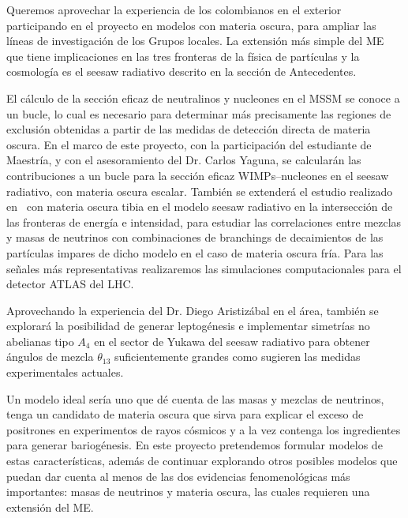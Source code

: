 \begin{darkmatter}
  Queremos aprovechar la experiencia de los colombianos en el exterior
  participando en el proyecto en modelos con materia oscura, para
  ampliar las líneas de investigación de los Grupos locales. La
  extensión más simple del ME que tiene implicaciones en las tres
  fronteras de la física de partículas y la cosmología es el seesaw
  radiativo descrito en la sección de Antecedentes.

  El cálculo de la sección eficaz de neutralinos y nucleones en el
  MSSM se conoce a un bucle, lo cual es necesario para determinar más
  precisamente las regiones de exclusión obtenidas a partir de las
  medidas de detección directa de materia oscura. En el marco de este
  proyecto, con la participación del estudiante de Maestría, y con el
  asesoramiento del Dr. Carlos Yaguna, se calcularán las contribuciones
  a un bucle para la sección eficaz WIMPs--nucleones en el seesaw
  radiativo, con materia oscura escalar. También se extenderá el
  estudio realizado en~\cite{Sierra:2008wj} con materia oscura tibia
  en el modelo seesaw radiativo en la intersección de las fronteras de
  energía e intensidad, para estudiar las correlaciones entre mezclas
  y masas de neutrinos con combinaciones de branchings de decaimientos
  de las partículas impares de dicho modelo en el caso de materia
  oscura fría. Para las señales más representativas realizaremos las
  simulaciones computacionales para el detector ATLAS del LHC.
\end{darkmatter}

\begin{leptogenesis}
  Aprovechando la experiencia del Dr. Diego Aristizábal en el área,
  también se explorará la posibilidad de generar leptogénesis e
  implementar simetrías no abelianas tipo $A_4$ en el sector de Yukawa
  del seesaw radiativo para obtener ángulos de mezcla $\theta_{13}$
  suficientemente grandes como sugieren las medidas experimentales
  actuales.
\end{leptogenesis}

Un modelo ideal sería uno que dé cuenta de las masas y mezclas de
neutrinos, tenga un candidato de materia oscura que sirva para explicar
el exceso de positrones en experimentos de rayos cósmicos y a la vez
contenga los ingredientes para generar bariogénesis.  En este
proyecto pretendemos formular modelos de estas características, además
de continuar explorando otros posibles modelos que puedan dar cuenta
al menos de las dos evidencias fenomenológicas más importantes: masas
de neutrinos y materia oscura, las cuales requieren una extensión del
ME.

